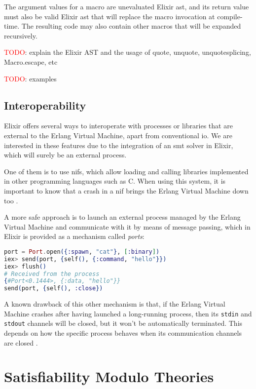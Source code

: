 The argument values for a macro are unevaluated Elixir \gls{ast}, and its return 
value must also be valid Elixir \gls{ast} that will replace the macro invocation 
at compile-time. The resulting code may also contain other macros that will be
expanded recursively.

\textcolor{red}{TODO}: explain the Elixir AST and the usage of quote, unquote, 
unquotesplicing, Macro.escape, etc

\textcolor{red}{TODO}: examples

\subsection{Interoperability}

Elixir offers several ways to interoperate with processes or libraries that are
external to the Erlang Virtual Machine, apart from conventional \gls{io}. We are
interested in these features due to the integration of an \acrshort{smt} solver
in Elixir, which will surely be an external process.

One of them is to use \gls{nif}s, which allow loading and calling libraries
implemented in other programming languages such as C. When using this system,
it is important to know that a crash in a \gls{nif} brings the Erlang Virtual 
Machine down too \citep{ErlangDocs}.

A more safe approach is to launch an external process managed by the Erlang
Virtual Machine and communicate with it by means of message passing, which in 
Elixir is provided as a mechanism called \textit{ports}:

\begin{lstlisting}[language=elixir,numbers=none,frame=none]
port = Port.open({:spawn, "cat"}, [:binary])
iex> send(port, {self(), {:command, "hello"}})
iex> flush()
# Received from the process
{#Port<0.1444>, {:data, "hello"}} 
send(port, {self(), :close})
\end{lstlisting}

A known drawback of this other mechanism is that, if the Erlang Virtual 
Machine crashes after having launched a long-running process, then its \verb|stdin| 
and \verb|stdout| channels will be closed, but it won't be automatically terminated.
This depends on how the specific process behaves when its communication channels are
closed \citep{ElixirDocs}.

\section{Satisfiability Modulo Theories}

